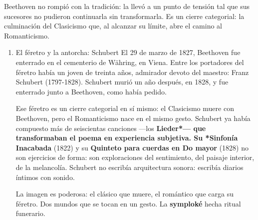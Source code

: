 \documentclass[14pt, a4paper]{article}
\begin{document}
Beethoven no rompió con la tradición: la llevó a un punto de tensión
tal que sus sucesores no pudieron continuarla sin transformarla. Es un
cierre categorial: la culminación del Clasicismo que, al alcanzar su
límite, abre el camino al Romanticismo.
\begin{enumerate}
\item El féretro y la antorcha: Schubert
\label{schubert-feretro}
El 29 de marzo de 1827, Beethoven fue enterrado en el cementerio de
Währing, en Viena. Entre los portadores del féretro había un joven de
treinta años, admirador devoto del maestro: Franz Schubert
(1797-1828). Schubert murió un año después, en 1828, y fue enterrado
junto a Beethoven, como había pedido.

Ese féretro es un cierre categorial en sí mismo: el Clasicismo
muere con Beethoven, pero el Romanticismo nace en el mismo gesto.
Schubert ya había compuesto más de seiscientas canciones —los
\textbf{Lieder*— que transformaban el poema en experiencia subjetiva. Su
*Sinfonía Inacabada} (1822) y su \textbf{Quinteto para cuerdas en Do mayor}
(1828) no son ejercicios de forma: son exploraciones del sentimiento,
del paisaje interior, de la melancolía. Schubert no escribía
arquitectura sonora: escribía diarios íntimos con sonido.

La imagen es poderosa: el clásico que muere, el romántico que carga su
féretro. Dos mundos que se tocan en un gesto. La \textbf{symploké} hecha
ritual funerario.
\end{enumerate}
\end{document}
